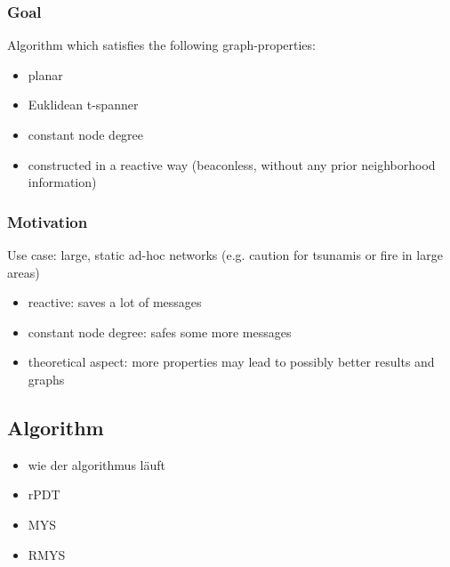 \documentclass[compress]{beamer}
\begin{document}
\begin{frame}
\frametitle{Goal}
Algorithm which satisfies the following graph-properties:
\begin{itemize}
\item planar
\item Euklidean t-spanner
\item constant node degree
\item constructed in a reactive way (beaconless, without any prior neighborhood information)
\end{itemize}
\end{frame}

\begin{frame}
\frametitle{Motivation}
Use case: large, static ad-hoc networks (e.g. caution for tsunamis or fire in large areas)
\begin{itemize}
\item reactive: saves a lot of messages
\item constant node degree: safes some more messages
\item theoretical aspect: more properties may lead to possibly better results and graphs
\end{itemize}
\end{frame}

\subsection{Algorithm}
\begin{frame}
\begin{itemize}
\item wie der algorithmus läuft
\item rPDT
\item MYS
\item RMYS
\end{itemize}
\end{frame}
\end{document}
